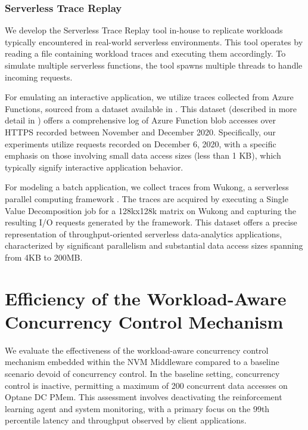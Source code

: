 \subsubsection{Serverless Trace Replay}

We develop the Serverless Trace Replay tool in-house to replicate workloads typically encountered in real-world serverless environments. This tool operates by reading a file containing workload traces and executing them accordingly. To simulate multiple serverless functions, the tool spawns multiple threads to handle incoming requests.

For emulating an interactive application, we utilize traces collected from Azure Functions, sourced from a dataset available in \cite{GitHubAz35:online}. This dataset (described in more detail in \cite{romero2021faat}) offers a comprehensive log of Azure Function blob accesses over HTTPS recorded between November and December 2020. Specifically, our experiments utilize requests recorded on December 6, 2020, with a specific emphasis on those involving small data access sizes (less than 1 KB), which typically signify interactive application behavior.

For modeling a batch application, we collect traces from Wukong, a serverless parallel computing framework \cite{carver2020wukong}. The traces are acquired by executing a Single Value Decomposition job for a 128kx128k matrix on Wukong and capturing the resulting I/O requests generated by the framework. This dataset offers a precise representation of throughput-oriented serverless data-analytics applications, characterized by significant parallelism and substantial data access sizes spanning from 4KB to 200MB.


\section{Efficiency of the Workload-Aware Concurrency Control Mechanism}

We evaluate the effectiveness of the workload-aware concurrency control mechanism embedded within the NVM Middleware compared to a baseline scenario devoid of concurrency control. In the baseline setting, concurrency control is inactive, permitting a maximum of 200 concurrent data accesses on Optane DC PMem. This assessment involves deactivating the reinforcement learning agent and system monitoring, with a primary focus on the 99th percentile latency and throughput observed by client applications.

